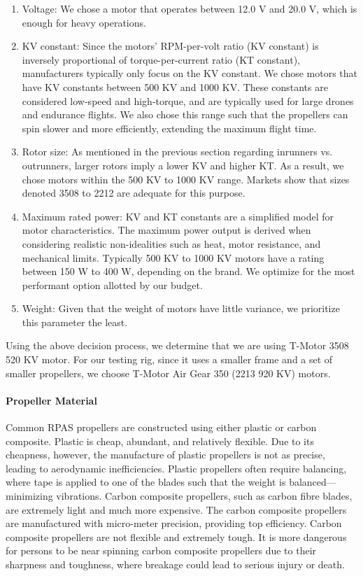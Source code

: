 \begin{enumerate}
    \item Voltage: We chose a motor that operates between 12.0 V and 20.0 V, which is enough for heavy operations.
    \item KV constant: Since the motors' RPM-per-volt ratio (KV constant) is inversely proportional of torque-per-current ratio (KT constant), manufacturers typically only focus on the KV constant. We chose motors that have KV constants between 500 KV and 1000 KV. These constants are considered low-speed and high-torque, and are typically used for large drones and endurance flights. We also chose this range such that the propellers can spin slower and more efficiently, extending the maximum flight time.
    \item Rotor size: As mentioned in the previous section regarding inrunners vs. outrunners, larger rotors imply a lower KV and higher KT. As a result, we chose motors within the 500 KV to 1000 KV range. Markets show that sizes denoted 3508 to 2212 are adequate for this purpose.
    \item Maximum rated power: KV and KT constants are a simplified model for motor characteristics. The maximum power output is derived when considering realistic non-idealities such as heat, motor resistance, and mechanical limits. Typically 500 KV to 1000 KV motors have a rating between 150 W to 400 W, depending on the brand. We optimize for the most performant option allotted by our budget.
    \item Weight: Given that the weight of motors have little variance, we prioritize this parameter the least.
\end{enumerate}

Using the above decision process, we determine that we are using T-Motor 3508 520 KV motor. For our testing rig, since it uses a smaller frame and a set of smaller propellers, we choose T-Motor Air Gear 350 (2213 920 KV) motors.

\paragraph{Propeller Material}

Common RPAS propellers are constructed using either plastic or carbon composite. Plastic is cheap, abundant, 
and relatively flexible. Due to its cheapness, however, the manufacture of plastic propellers is not as precise, leading to 
aerodynamic inefficiencies. Plastic propellers often require balancing, where tape is applied to one of the 
blades such that the weight is balanced---minimizing vibrations. Carbon composite propellers, such as 
carbon fibre blades, are extremely light and much more expensive. The carbon composite 
propellers are manufactured with micro-meter precision, providing top efficiency. Carbon composite 
propellers are not flexible and extremely tough. It is more dangerous for persons to be near spinning 
carbon composite propellers due to their sharpness and toughness, where breakage could lead to serious injury or death.


